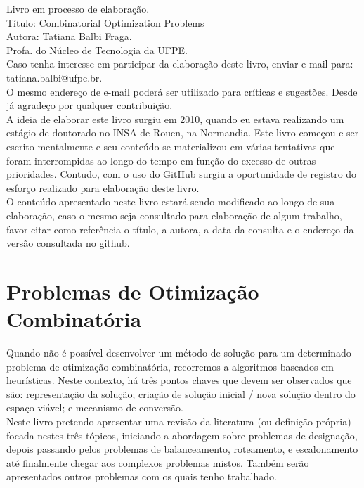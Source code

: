 \documentclass{book}
\begin{document}
Livro em processo de elaboração. \\

Título: Combinatorial Optimization Problems \\

Autora: Tatiana Balbi Fraga. \\

Profa. do Núcleo de Tecnologia da UFPE. \\

Caso tenha interesse em participar da elaboração deste livro, enviar e-mail para: tatiana.balbi@ufpe.br.\\

O mesmo endereço de e-mail poderá ser utilizado para críticas e sugestões. Desde já agradeço por qualquer contribuição. \\

A ideia de elaborar este livro surgiu em 2010, quando eu estava realizando um estágio de doutorado no INSA de Rouen, na Normandia. Este livro começou e ser escrito mentalmente e seu conteúdo se materializou em várias tentativas que foram interrompidas ao longo do tempo em função do excesso de outras prioridades. Contudo, com o uso do GitHub surgiu a oportunidade de registro do esforço realizado para elaboração deste livro. \\

O conteúdo apresentado neste livro estará sendo modificado ao longo de sua elaboração, caso o mesmo seja consultado para elaboração de algum trabalho, favor citar como referência o título, a autora, a data da consulta e o endereço da versão consultada no github. \\

\chapter{Problemas de Otimização Combinatória}

Quando não é possível desenvolver um método de solução para um determinado problema de otimização combinatória, recorremos a algoritmos baseados em heurísticas. Neste contexto, há três pontos chaves que devem ser observados que são: representação da solução; criação de solução inicial / nova solução dentro do espaço viável; e mecanismo de conversão. \\

Neste livro pretendo apresentar uma revisão da literatura (ou definição própria) focada nestes três tópicos, iniciando a abordagem sobre problemas de designação, depois passando pelos problemas de balanceamento, roteamento, e escalonamento até finalmente chegar aos complexos problemas mistos. Também serão apresentados outros problemas com os quais tenho trabalhado. \\
\end{document}
